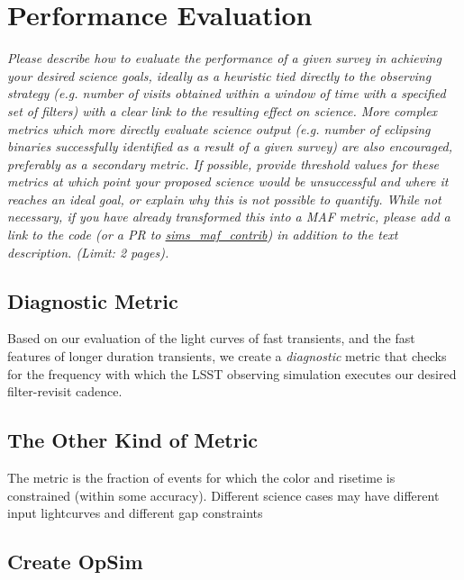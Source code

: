 \documentclass[12pt, letterpaper]{article}
\begin{document}
\clearpage
\section{Performance Evaluation}
\begin{footnotesize}
{\it Please describe how to evaluate the performance of a given survey in achieving your desired science goals, ideally as a heuristic tied directly to the observing strategy (e.g. number of visits obtained within a window of time with a specified set of filters) with a clear link to the resulting effect on science. More complex metrics which more directly evaluate science output (e.g. number of eclipsing binaries successfully identified as a result of a given survey) are also encouraged, preferably as a secondary metric. If possible, provide threshold values for these metrics at which point your proposed science would be unsuccessful and where it reaches an ideal goal, or explain why this is not possible to quantify. While not necessary, if you have already transformed this into a MAF metric, please add a link to the code (or a PR to \href{https://github.com/lsst-nonproject/sims_maf_contrib}{sims\_maf\_contrib}) in addition to the text description. (Limit: 2 pages).}
\end{footnotesize}

\subsection{Diagnostic Metric}

Based on our evaluation of the light curves of fast transients, and the fast features of longer duration transients, we create a {\it diagnostic} metric that checks for the frequency with which the LSST observing simulation executes our desired filter-revisit cadence. 

\subsection{The Other Kind of Metric}

The metric is the fraction of events for which the color and risetime is constrained (within some accuracy). Different science cases may have different input lightcurves and different gap constraints


\subsection{Create OpSim}
\end{document}
